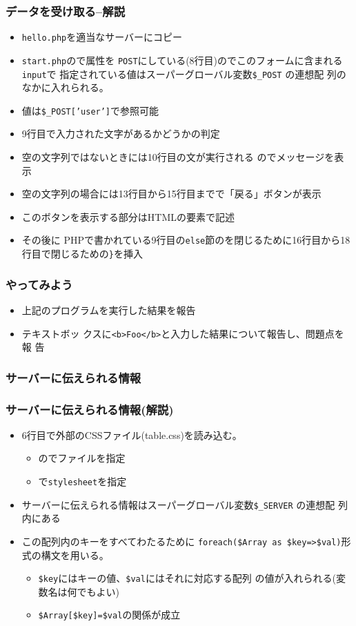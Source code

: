 \begin{frame}[containsverbatim]
 \frametitle{データを受け取る--解説}
 \begin{itemize}
  \item  \texttt{hello.php}を適当なサーバーにコピー
  \item \texttt{start.php}ので属性を
       \texttt{POST}にしている(8行目)のでこのフォームに含まれる\texttt{input}で
       指定されている値はスーパーグローバル変数\texttt{\$\_POST} の連想配
       列のなかに入れられる。
  \item 値は\texttt{\$\_POST['user']}で参照可能
  \item 9行目で入力された文字があるかどうかの判定
  \item 空の文字列ではないときには10行目の文が実行される
       のでメッセージを表示
  \item 空の文字列の場合には13行目から15行目までで「戻る」ボタンが表示
  \item このボタンを表示する部分はHTMLの要素で記述
  \item その後に
       PHPで書かれている9行目の\texttt{else}節のを閉じるために16行目から18
       行目で閉じるための\texttt{\}}を挿入
 \end{itemize}
\end{frame}
\begin{frame}[containsverbatim]
 \frametitle{やってみよう}
 \begin{itemize}
  \item 上記のプログラムを実行した結果を報告
  \item テキストボッ
       クスに\texttt{<b>Foo</b>}と入力した結果について報告し、問題点を報
        告
 \end{itemize}
\end{frame}
\begin{frame}[containsverbatim]
 \frametitle{サーバーに伝えられる情報}
\end{frame}
\begin{frame}[containsverbatim]
 \frametitle{サーバーに伝えられる情報(解説)}
 \begin{itemize}
	\item 6行目で外部のCSSファイル(table.css)を読み込む。
				\begin{itemize}
				 \item {}のでファイルを指定
				 \item {}で\Verb+stylesheet+を指定
				\end{itemize}
	\item サーバーに伝えられる情報はスーパーグローバル変数\texttt{\$\_SERVER} の連想配
       列内にある
	\item この配列内のキーをすべてわたるために
				\Verb+foreach($Array as $key=>$val)+形式の構文を用いる。
				\begin{itemize}
				 \item \Verb+$key+にはキーの値、\Verb+$val+にはそれに対応する配列
							 の値が入れられる(変数名は何でもよい)
				 \item \Verb+$Array[$key]=$val+の関係が成立
				\end{itemize}
 \end{itemize}
\end{frame}
